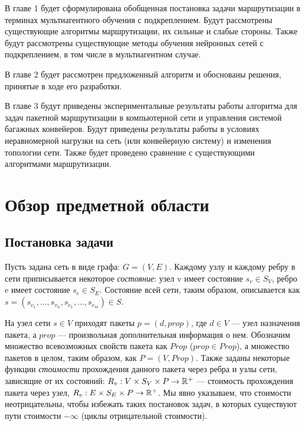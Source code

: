 \documentclass[specification, annotation]{itmo-student-thesis}
\begin{document}
В главе 1 будет сформулирована обобщенная постановка задачи маршрутизации в
терминах мультиагентного обучения с подкреплением. Будут рассмотрены
существующие алгоритмы маршрутизации, их сильные и слабые стороны. Также будут
рассмотрены существующие методы обучения нейронных сетей с подкреплением, в том
числе в мультиагентном случае.

В главе 2 будет рассмотрен предложенный алгоритм и обоснованы решения, принятые
в ходе его разработки.

В главе 3 будут приведены экспериментальные результаты работы алгоритма для
задач пакетной маршрутизации в компьютерной сети и управления системой багажных
конвейеров. Будут приведены результаты работы в условиях неравномерной
нагрузки на сеть (или конвейерную систему) и изменения топологии сети. Также
будет проведено сравнение с существующими алгоритмами маршрутизации.

\startrelatedwork

\chapter{Обзор предметной области}

\section{Постановка задачи}\label{task-setting}
Пусть задана сеть в виде графа: $G = (V, E)$. Каждому узлу и каждому ребру в сети
приписывается некоторое \textit{состояние}: узел v имеет состояние $s_v \in S_V$, ребро e
имеет состояние $s_e \in S_E$. Состояние всей сети, таким образом, описывается как
$s = (s_{v_1}, ... , s_{v_n}, s_{e_1}, ... , s_{e_m}) \in S$.

На узел сети $s \in V$ приходят пакеты $p = (d, prop)$, где $d \in V$ --- узел
назначения пакета, а $prop$ --- произвольная дополнительная информация о нем.
Обозначим множество всевозможных свойств пакета как $Prop$ ($prop \in Prop$), а
множество пакетов в целом, таким образом, как $P = (V, Prop)$. Также заданы
некоторые функции \textit{стоимости} прохождения данного пакета через ребра и
узлы сети, зависящие от их состояний:
$R_v : V \times S_V \times P \rightarrow \Bbb{R}^+$ --- стоимость прохождения
пакета через узел, $R_e : E \times S_E \times P \rightarrow \Bbb{R}^+$. Мы явно
указываем, что стоимости неотрицательны, чтобы избежать таких постановок задач,
в которых существуют пути стоимости $-\infty$ (циклы отрицательной стоимости).
\end{document}
